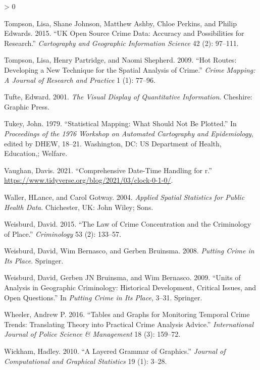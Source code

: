 \documentclass[
  krantz2]{krantz}
\newlength{\cslhangindent}
\newenvironment{CSLReferences}[2] %
 {%
  \setlength{\parindent}{0pt}
  \ifodd #1 \everypar{\setlength{\hangindent}{\cslhangindent}}\ignorespaces\fi
  \ifnum #2 > 0
  \setlength{\parskip}{#2\baselineskip}
  \fi
 }%
 {}
\begin{document}
\begin{CSLReferences}{1}{0}
\leavevmode\hypertarget{ref-Tompson_2015}{}%
Tompson, Lisa, Shane Johnson, Matthew Ashby, Chloe Perkins, and Philip Edwards. 2015. {``UK Open Source Crime Data: Accuracy and Possibilities for Research.''} \emph{Cartography and Geographic Information Science} 42 (2): 97--111.

\leavevmode\hypertarget{ref-Tompson_2009}{}%
Tompson, Lisa, Henry Partridge, and Naomi Shepherd. 2009. {``Hot Routes: Developing a New Technique for the Spatial Analysis of Crime.''} \emph{Crime Mapping: A Journal of Research and Practice} 1 (1): 77--96.

\leavevmode\hypertarget{ref-Tufte_2001}{}%
Tufte, Edward. 2001. \emph{The Visual Display of Quantitative Information}. Cheshire: Graphic Press.

\leavevmode\hypertarget{ref-Tukey_1979}{}%
Tukey, John. 1979. {``Statistical Mapping: What Should Not Be Plotted.''} In \emph{Proceedings of the 1976 Workshop on Automated Cartography and Epidemiology}, edited by DHEW, 18--21. Washington, DC: US Department of Health, Education,; Welfare.

\leavevmode\hypertarget{ref-Vaughan_2021}{}%
Vaughan, Davis. 2021. {``Comprehensive Date-Time Handling for r.''} \url{https://www.tidyverse.org/blog/2021/03/clock-0-1-0/}.

\leavevmode\hypertarget{ref-Waller_2004}{}%
Waller, HLance, and Carol Gotway. 2004. \emph{Applied Spatial Statistics for Public Health Data}. Chichester, UK: John Wiley; Sons.

\leavevmode\hypertarget{ref-Weisburd_2015}{}%
Weisburd, David. 2015. {``The Law of Crime Concentration and the Criminology of Place.''} \emph{Criminology} 53 (2): 133--57.

\leavevmode\hypertarget{ref-Weisburd_2008}{}%
Weisburd, David, Wim Bernasco, and Gerben Bruinsma. 2008. \emph{Putting Crime in Its Place}. Springer.

\leavevmode\hypertarget{ref-Weisburd_2009}{}%
Weisburd, David, Gerben JN Bruinsma, and Wim Bernasco. 2009. {``Units of Analysis in Geographic Criminology: Historical Development, Critical Issues, and Open Questions.''} In \emph{Putting Crime in Its Place}, 3--31. Springer.

\leavevmode\hypertarget{ref-Wheeler_2016}{}%
Wheeler, Andrew P. 2016. {``Tables and Graphs for Monitoring Temporal Crime Trends: Translating Theory into Practical Crime Analysis Advice.''} \emph{International Journal of Police Science \& Management} 18 (3): 159--72.

\leavevmode\hypertarget{ref-Wickham_2010}{}%
Wickham, Hadley. 2010. {``A Layered Grammar of Graphics.''} \emph{Journal of Computational and Graphical Statistics} 19 (1): 3--28.


\end{CSLReferences}
\end{document}
